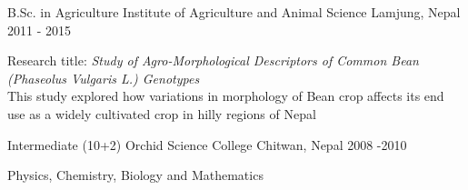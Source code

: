 \begin{cventries}
  \cventry
    {B.Sc. in Agriculture}
    {Institute of Agriculture and Animal Science}
    {Lamjung, Nepal}
    {2011 - 2015}
    {
      \begin{cvitems}
        \item{Research title: \emph{Study of Agro-Morphological Descriptors of Common Bean (Phaseolus Vulgaris L.) Genotypes} \\ This study explored how variations in morphology of Bean crop affects its end use as a widely cultivated crop in hilly regions of Nepal}
      \end{cvitems}
    }
    
  \cventry
    {Intermediate (10+2) {}}
    {Orchid Science College}
    {Chitwan, Nepal}
    {2008 -2010}
    {
      \begin{cvitems}
        \item {Physics, Chemistry, Biology and Mathematics}
      \end{cvitems}
    }
\end{cventries}
